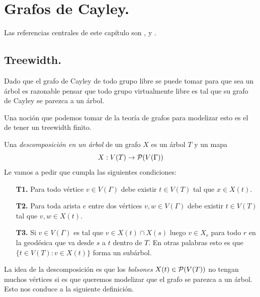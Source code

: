 \documentclass[tesis.tex]{subfiles}
\begin{document}
	
\chapter{Grafos de Cayley.} \label{seccion_treewidth}

Las referencias centrales de este capítulo son \cite{diekert2017context}, \cite{kuske2005logical} y \cite{diestel2005graph}.





\section{Treewidth.}

Dado que el grafo de Cayley de todo grupo libre se puede tomar para que sea un árbol es razonable pensar que todo grupo virtualmente libre es tal que su grafo de Cayley se parezca a un árbol. 

Una noción que podemos tomar de la teoría de grafos para modelizar esto es el de tener un treewidth finito.

\begin{deff}\label{desc-arbol}
	Una \emph{descomposición en un árbol} de un grafo $X$ es un árbol $T$ y un mapa 
	\[
	X: V(T) \to {\cal P}(V(\Gamma))
	\]
	Le vamos a pedir que cumpla las siguientes condiciones:
	\begin{enumerate}
		\item[\textbf{T1.}] Para todo vértice $v \in V(\Gamma)$ debe existir $t \in V(T)$ tal que $x \in X(t)$. 
		\item[\textbf{T2.}] Para toda arista $e$ entre dos vértices $v,w \in V(\Gamma)$ debe existir $t \in V(T)$ tal que $v,w \in X(t)$.
		\item[\textbf{T3.}] Si $v \in V(\Gamma)$ es tal que $v \in X(t) \cap X(s)$ luego $v \in X_r$ para todo $r$ en la geodésica que va desde $s$ a $t$ dentro de $T$. En otras palabras esto es que $\{ t \in V(T) :  v \in X(t) \}$ forma un subárbol. 
	\end{enumerate} 
\end{deff}
\smallskip

La idea de la descomposición es que los \emph{bolsones} $X(t) \in {\cal P}(V(T))$ no tengan muchos vértices si es que queremos modelizar que el grafo se parezca a un árbol. Esto nos conduce a la siguiente definición.
\end{document}
